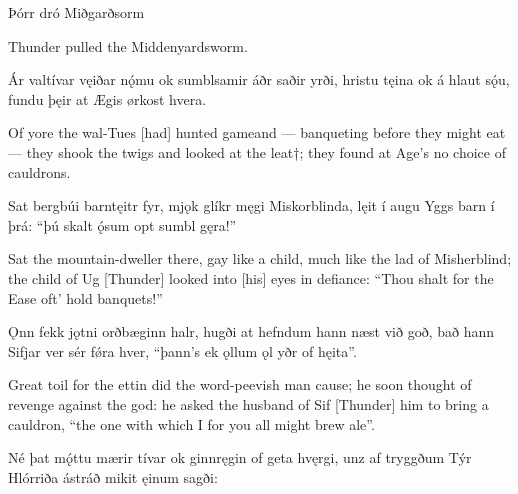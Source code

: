 Þórr dró Miðgarðsorm

Thunder pulled the Middenyardsworm.

Ár valtívar \hld vęiðar nǫ́mu
ok sumblsamir \hld áðr saðir yrði,
hristu tęina \hld ok á hlaut sǫ́u,
fundu þęir at Ægis \hld ørkost hvera.

Of yore the wal-Tues [had] hunted game\footnotemark[1] and — banqueting before they might eat\footnotemark[1] — they shook the twigs and looked at the leat†; they found at Age’s no choice of cauldrons.

Sat bergbúi \hld barntęitr fyr,
mjǫk glíkr męgi \hld Miskorblinda,
lęit í augu \hld Yggs barn í þrá:
“þú skalt ǫ́sum \hld opt sumbl gęra!”

Sat the mountain-dweller there, gay like a child, much like the lad of Misherblind; the child of Ug [Thunder] looked into [his] eyes in defiance: “Thou shalt for the Ease oft’ hold banquets!”

Ǫnn fekk jǫtni \hld orðbæginn halr,
hugði at hefndum \hld hann næst við goð,
bað hann Sifjar ver \hld sér fǿra hver,
“þann’s ek ǫllum ǫl \hld yðr of hęita”.

Great toil for the ettin did the word-peevish man cause; he soon thought of revenge against the god: he asked the husband of Sif [Thunder] him to bring a cauldron, “the one with which I for you all might brew ale”.

Né þat mǫ́ttu \hld mærir tívar
ok ginnręgin \hld of geta hvęrgi,
unz af tryggðum \hld Týr Hlórriða
ástráð mikit \hld ęinum sagði: 
